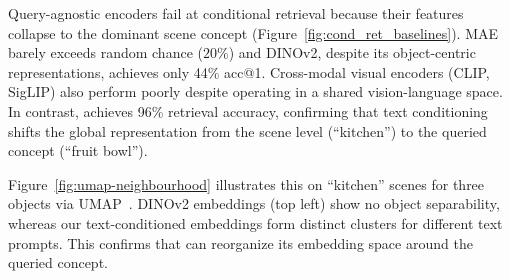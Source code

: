 Query-agnostic encoders fail at conditional retrieval because their features collapse to the dominant scene concept (Figure~\ref{fig:cond_ret_baselines}).
MAE barely exceeds random chance ($20\%$) and DINOv2, despite its object-centric representations, achieves only 44\% acc@1.
Cross-modal visual encoders (CLIP, SigLIP) also perform poorly despite operating in a shared vision-language space.
In contrast, \model{} achieves 96\% retrieval accuracy, confirming that text conditioning shifts the global representation from the scene level (``kitchen'') to the queried concept (``fruit bowl''). 

Figure~\ref{fig:umap-neighbourhood} illustrates this on ``kitchen'' scenes for three objects via UMAP~\cite{UMAP}.
DINOv2 embeddings (top left) show no object separability,
whereas our text-conditioned embeddings form distinct clusters for different text prompts.
This confirms that \model{} can reorganize its embedding space around the queried concept.



